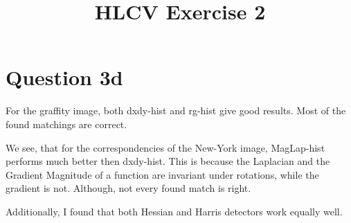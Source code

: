 \documentclass[a4paper]{scrartcl}
\begin{document}
\setlength{\parindent}{0pt}
\title{HLCV Exercise 2}


\maketitle
\section*{Question 3d}
For the graffity image, both dxdy-hist and rg-hist give good results. Most of the found matchings are correct. 

We see, that for the correspondencies of the New-York image, MagLap-hist performs much better then dxdy-hist. This is because the Laplacian and the Gradient Magnitude of a function are invariant under rotations, while the gradient is not. Although, not every found match is right.

Additionally, I found that both Hessian and Harris detectors work equally well.
\end{document}
